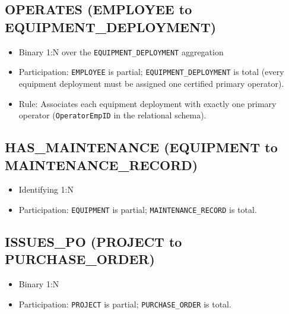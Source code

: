 \documentclass[a4paper,12pt]{report}
\providecommand{\tightlist}{%
  \setlength{\itemsep}{0pt}\setlength{\parskip}{0pt}}
\begin{document}
\subsection{\texorpdfstring{OPERATES (EMPLOYEE to EQUIPMENT\texorpdfstring{\_\allowbreak{}}{_}DEPLOYMENT)}{OPERATES (EMPLOYEE to EQUIPMENTDEPLOYMENT)}}\label{operates-employee-to-equipment_deployment}

\begin{itemize}
\tightlist
\item
  Binary 1:N over the \texttt{EQUIPMENT\_\allowbreak{}DEPLOYMENT} aggregation
\item
  Participation: \texttt{EMPLOYEE} is partial; \texttt{EQUIPMENT\_\allowbreak{}DEPLOYMENT} is total (\allowbreak{}every equipment deployment must be assigned one certified primary operator).
\item
  Rule: Associates each equipment deployment with exactly one primary operator (\allowbreak{}\texttt{OperatorEmpID} in the relational schema).
\end{itemize}

\subsection{\texorpdfstring{HAS\texorpdfstring{\_\allowbreak{}}{_}MAINTENANCE (EQUIPMENT to MAINTENANCE\texorpdfstring{\_\allowbreak{}}{_}RECORD)}{HASMAINTENANCE (EQUIPMENT to MAINTENANCERECORD)}}\label{has_maintenance-equipment-to-maintenance_record}

\begin{itemize}
\tightlist
\item
  Identifying 1:N
\item
  Participation: \texttt{EQUIPMENT} is partial; \texttt{MAINTENANCE\_\allowbreak{}RECORD} is total.
\end{itemize}

\subsection{\texorpdfstring{ISSUES\texorpdfstring{\_\allowbreak{}}{_}PO (PROJECT to PURCHASE\texorpdfstring{\_\allowbreak{}}{_}ORDER)}{ISSUESPO (PROJECT to PURCHASEORDER)}}\label{issues_po-project-to-purchase_order}

\begin{itemize}
\tightlist
\item
  Binary 1:N
\item
  Participation: \texttt{PROJECT} is partial; \texttt{PURCHASE\_\allowbreak{}ORDER} is total.
\end{itemize}
\end{document}
